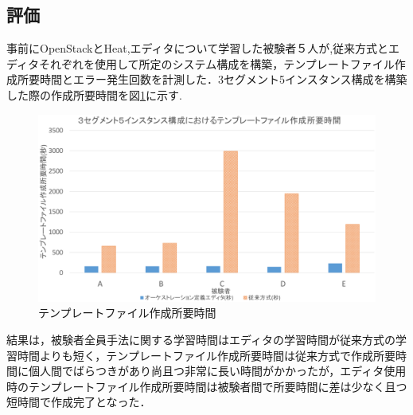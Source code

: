\documentclass[a4j]{jarticle}
\begin{document}
\begin{Abstract}
 \section{評価}
 事前にOpenStackとHeat,エディタについて学習した被験者５人が,従来方式とエディタそれぞれを使用して所定のシステム構成を構築，テンプレートファイル作成所要時間とエラー発生回数を計測した．3セグメント5インスタンス構成を構築した際の作成所要時間を図\ref{graf:2}に示す.
 \begin{figure}[H]
 	\begin{center}
 		\vspace{-4mm}
 		\includegraphics[scale=0.265]{Document/Abstract_Comparison.eps}
 		\caption{テンプレートファイル作成所要時間}
 		\label{graf:2}
 	\end{center}
 \end{figure}
 \vspace{-8mm}
 結果は，被験者全員手法に関する学習時間はエディタの学習時間が従来方式の学習時間よりも短く，テンプレートファイル作成所要時間は従来方式で作成所要時間に個人間でばらつきがあり尚且つ非常に長い時間がかかったが，エディタ使用時のテンプレートファイル作成所要時間は被験者間で所要時間に差は少なく且つ短時間で作成完了となった．
 

\end{Abstract}
\end{document}
